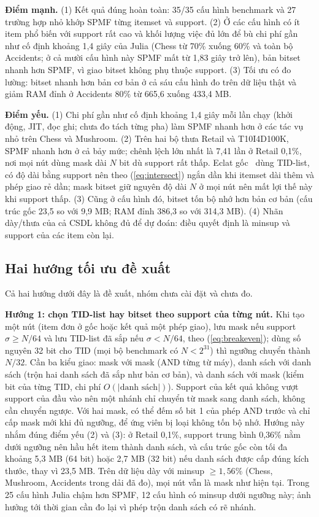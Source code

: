 \textbf{Điểm mạnh.} (1) Kết quả đúng hoàn toàn: 35/35 cấu hình benchmark và 27 trường hợp nhỏ khớp SPMF từng
itemset và support. (2) Ở các cấu hình có ít item phổ biến với support rất cao và khối lượng việc đủ lớn để bù chi phí
gần như cố định khoảng 1,4 giây của Julia (Chess từ 70\% xuống 60\% và toàn bộ Accidents; ở cả mười cấu hình này
SPMF mất từ 1,83 giây trở lên), bản bitset nhanh hơn SPMF, vì giao bitset không phụ thuộc support. (3) Tối ưu có đo lường: bitset nhanh
hơn bản cơ bản ở cả sáu cấu hình đo trên dữ liệu thật và giảm RAM đỉnh ở Accidents 80\% từ 665,6 xuống 433,4 MB.

\textbf{Điểm yếu.} (1) Chi phí gần như cố định khoảng 1,4 giây mỗi lần chạy (khởi động, JIT, đọc ghi; chưa đo
tách từng pha) làm SPMF nhanh hơn ở các tác vụ nhỏ trên Chess và Mushroom. (2) Trên hai bộ thưa Retail và
T10I4D100K, SPMF nhanh hơn ở cả bảy mức; chênh lệch lớn nhất là 7,41 lần ở Retail 0,1\%, nơi mọi nút dùng mask
dài $N$ bit dù support rất thấp. Eclat gốc~\cite{zaki2000scalable} dùng TID-list, có độ dài bằng support nên
theo (\ref{eq:intersect}) ngắn dần khi itemset dài thêm và phép giao rẻ dần; mask bitset giữ nguyên độ dài $N$ ở
mọi nút nên mất lợi thế này khi support thấp. (3) Cũng
ở cấu hình đó, bitset tốn bộ nhớ hơn bản cơ bản (cấu trúc gốc 23,5 so với 9,9 MB; RAM đỉnh 386,3 so với 314,3
MB). (4) Nhãn dày/thưa của cả CSDL không đủ để dự đoán: điều quyết định là minsup và support của các item còn lại.

\subsection{Hai hướng tối ưu đề xuất}
\label{sec:eval-future}

Cả hai hướng dưới đây là đề xuất, nhóm chưa cài đặt và chưa đo.

\textbf{Hướng 1: chọn TID-list hay bitset theo support của từng nút.} Khi tạo một nút (item đơn ở gốc hoặc kết
quả một phép giao), lưu mask nếu support $\sigma \ge N/64$ và lưu TID-list đã sắp nếu $\sigma < N/64$, theo
(\ref{eq:breakeven}); dùng số nguyên 32 bit cho TID (mọi bộ benchmark có $N < 2^{31}$) thì ngưỡng chuyển thành
$N/32$. Cần ba kiểu giao: mask với mask (AND từng từ máy), danh sách với danh sách (trộn hai danh sách đã sắp như
bản cơ bản), và danh sách với mask (kiểm bit của từng TID, chi phí $O(|\text{danh sách}|)$). Support của kết quả
không vượt support của đầu vào nên một nhánh chỉ chuyển từ mask sang danh sách, không cần chuyển ngược. Với hai
mask, có thể đếm số bit 1 của phép AND trước và chỉ cấp mask mới khi đủ ngưỡng, để ứng viên bị loại không tốn
bộ nhớ. Hướng này nhắm đúng điểm yếu (2) và (3): ở Retail 0,1\%, support trung bình 0,36\% nằm dưới ngưỡng nên
hầu hết item thành danh sách, và cấu trúc gốc còn tối đa khoảng 5,3 MB (64 bit) hoặc 2,7 MB (32 bit) nếu danh
sách được cấp đúng kích thước, thay vì 23,5 MB. Trên dữ liệu dày với minsup $\ge 1{,}56\%$ (Chess, Mushroom,
Accidents trong dải đã đo), mọi nút vẫn là mask như hiện tại. Trong 25 cấu hình Julia chậm hơn SPMF, 12 cấu hình
có minsup dưới ngưỡng này; ảnh hưởng tới thời gian cần đo lại vì phép trộn danh sách có rẽ nhánh.

